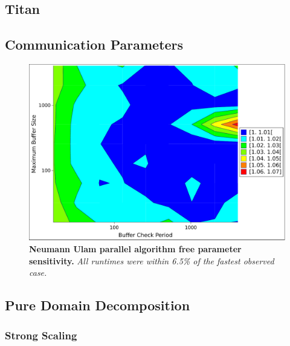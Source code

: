 \subsection{Titan }
\label{subsec:titan}

\subsection{Communication Parameters}
\label{subsec:comm_parameters}

\begin{figure}[htpb!]
  \begin{center}
    \includegraphics[width=6in]{chapters/parallel_mc/titan_comm_parameters.pdf}
  \end{center}
  \caption{\textbf{Neumann Ulam parallel algorithm free parameter
      sensitivity.}  \textit{All runtimes were within 6.5\% of the
      fastest observed case.}}
  \label{fig:titan_comm_parameters}
\end{figure}

\clearpage

\subsection{Pure Domain Decomposition}
\label{subsec:pure_domain_decomp}

\subsubsection{Strong Scaling}
\label{subsubsec:pure_strong}

